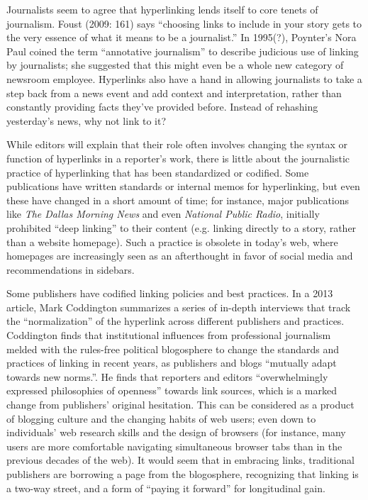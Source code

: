 Journalists seem to agree that hyperlinking lends itself to core tenets of journalism. Foust (2009: 161) says ``choosing links to include in your story gets to the very essence of what it means to be a journalist.''\autocite{de_maeyer_} In 1995(?), Poynter's Nora Paul coined the term ``annotative journalism'' to describe judicious use of linking by journalists; she suggested that this might even be a whole new category of newsroom employee.\autocite{paul_1995} Hyperlinks also have a hand in allowing journalists to take a step back from a news event and add context and interpretation, rather than constantly providing facts they've provided before. Instead of rehashing yesterday's news, why not link to it?

While editors will explain that their role often involves changing the syntax or function of hyperlinks in a reporter's work, there is little about the journalistic practice of hyperlinking that has been standardized or codified. Some publications have written standards or internal memos for hyperlinking, but even these have changed in a short amount of time; for instance, major publications like \emph{The Dallas Morning News} and even \emph{National Public Radio}, initially prohibited ``deep linking'' to their content (e.g. linking directly to a story, rather than a website homepage). Such a practice is obsolete in today's web, where homepages are increasingly seen as an afterthought in favor of social media and recommendations in sidebars.

Some publishers have codified linking policies and best practices. In a 2013 article, Mark Coddington summarizes a series of in-depth interviews that track the ``normalization'' of the hyperlink across different publishers and practices. Coddington finds that institutional influences from professional journalism melded with the rules-free political blogosphere to change the standards and practices of linking in recent years, as publishers and blogs ``mutually adapt towards new norms.''\autocite{coddington_normalizing_2013}. He finds that reporters and editors ``overwhelmingly expressed philosophies of openness'' towards link sources, which is a marked change from publishers' original hesitation.\autocite{coddington_building_2012} This can be considered as a product of blogging culture and the changing habits of web users; even down to individuals' web research skills and the design of browsers (for instance, many users are more comfortable navigating simultaneous browser tabs than in the previous decades of the web). It would seem that in embracing links, traditional publishers are borrowing a page from the blogosphere, recognizing that linking is a two-way street, and a form of ``paying it forward'' for longitudinal gain.

